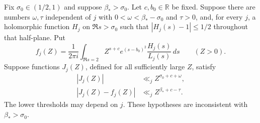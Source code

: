 \begin{proposition}\label{qr-prop-uniform-continuation}
Fix $\sigma_0\in(1/2,1)$ and suppose $\beta_*>\sigma_0$.
Let $c,b_0\in\mathbb R$ be fixed. Suppose there are numbers
$\omega,\tau$ independent of $j$ with
$0<\omega<\beta_*-\sigma_0$ and $\tau>0$, and, for every $j$,
a holomorphic function $H_j$ on $\Re s>\sigma_0$ such that
$|H_j(s)-1|\leq1/2$ throughout that half-plane. Put
\begin{equation}\label{qr-eq-gaussian-mellin}
 f_j(Z)=\frac1{2\pi i}\int_{\Re s=2}
       Z^{s+c}e^{(s-b_0)^2}\frac{H_j(s)}{L_j(s)}\,ds
       \qquad(Z>0).
\end{equation}
Suppose functions $J_j(Z)$, defined for all sufficiently large $Z$,
satisfy
\begin{align}
 |J_j(Z)|&\ll_j Z^{\sigma_0+c+\omega},
       \label{qr-eq-first-comparison}\\
 |J_j(Z)-f_j(Z)|&\ll_j Z^{\beta_*+c-\tau}.
       \label{qr-eq-second-comparison}
\end{align}
The lower thresholds may depend on $j$. These hypotheses are
inconsistent with $\beta_*>\sigma_0$.
\end{proposition}

